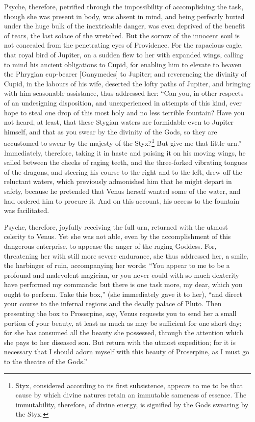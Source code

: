 \documentclass[12pt]{article}
\begin{document}
Psyche, therefore, petrified through the impossibility of accomplishing the
task, though she was present in body, was absent in mind, and being perfectly
buried under the huge bulk of the inextricable danger, was even deprived of the
benefit of tears, the last solace of the wretched. But the sorrow of the
innocent soul is not concealed from the penetrating eyes of Providence. For the
rapacious eagle, that royal bird of Jupiter, on a sudden flew to her with
expanded wings, calling to mind his ancient obligations to Cupid, for enabling
him to elevate to heaven the Phrygian cup-bearer [Ganymedes] to Jupiter; and
reverencing the divinity of Cupid, in the labours of his wife, deserted the
lofty paths of Jupiter, and bringing with him seasonable assistance, thus
addressed her: ``Can you, in other respects of an undesigning disposition, and
unexperienced in attempts of this kind, ever hope to steal one drop of this
most holy and no less terrible fountain? Have you not heard, at least, that
these Stygian waters are formidable even to Jupiter himself, and that as you
swear by the divinity of the Gods, so they are accustomed to swear by the
majesty of the Styx?\footnote{Styx, considered according to its first
subsistence, appears to me to be that cause by which divine natures retain an
immutable sameness of essence. The immutability, therefore, of divine energy,
is signified by the Gods swearing by the Styx.} But give me that little urn.''
Immediately, therefore, taking it in haste and poising it on his moving wings,
he sailed between the cheeks of raging teeth, and the three-forked vibrating
tongues of the dragons, and steering his course to the right and to the left,
drew off the reluctant waters, which previously admonished him that he might
depart in safety, because he pretended that Venus herself wanted some of the
water, and had ordered him to procure it. And on this account, his access to
the fountain was facilitated.

Psyche, therefore, joyfully receiving the full urn, returned with the utmost
celerity to Venus. Yet she was not able, even by the accomplishment of this
dangerous enterprise, to appease the anger of the raging Goddess. For,
threatening her with still more severe endurance, she thus addressed her, a
smile, the harbinger of ruin, accompanying her words: ``You appear to me to be
a profound and malevolent magician, or you never could with so much dexterity
have performed my commands: but there is one task more, my dear, which you
ought to perform. Take this box,'' (she immediately gave it to her), ``and
direct your course to the infernal regions and the deadly palace of Pluto. Then
presenting the box to Proserpine, say, Venus requests you to send her a small
portion of your beauty, at least as much as may be sufficient for one short
day; for she has consumed all the beauty she possessed, through the attention
which she pays to her diseased son. But return with the utmost expedition; for
it is necessary that I should adorn myself with this beauty of Proserpine, as I
must go to the theatre of the Gods.''
\end{document}
